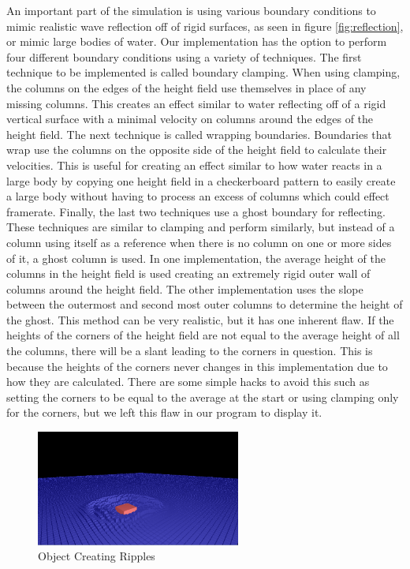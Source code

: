 \documentclass[11pt]{article}
\begin{document}
An important part of the simulation is using various boundary conditions to 
mimic realistic wave reflection off of rigid surfaces, as seen in figure 
\ref{fig:reflection}, or mimic large bodies of 
water. Our implementation has the option to perform four different boundary 
conditions using a variety of techniques. The first technique to be implemented 
is called boundary clamping. When using clamping, the columns on the edges of 
the height field use themselves in place of any missing columns. This creates 
an effect similar to water reflecting off of a rigid vertical surface with a 
minimal velocity on columns around the edges of the height field. The next 
technique is called wrapping boundaries. Boundaries that wrap use the columns 
on the opposite side of the height field to calculate their velocities. This is 
useful for creating an effect similar to how water reacts in a large body by 
copying one height field in a checkerboard pattern to easily create a large 
body without having to process an excess of columns which could effect 
framerate. Finally, the last two techniques use a ghost boundary for 
reflecting. These techniques are similar to clamping and perform similarly, but 
instead of a column using itself as a reference when there is no column on one 
or more sides of it, a ghost column is used. In one implementation, the average 
height of the columns in the height field is used creating an extremely rigid 
outer wall of columns around the height field. The other implementation uses 
the slope between the outermost and second most outer columns to determine the 
height of the ghost. This method can be very realistic, but it has one inherent 
flaw. If the heights of the corners of the height field are not equal to the 
average height of all the columns, there will be a slant leading to the corners 
in question. This is because the heights of the corners never changes in this 
implementation due to how they are calculated. There are some simple hacks to 
avoid this such as setting the corners to be equal to the average at the start 
or using clamping only for the corners, but we left this flaw in our program to 
display it.

\begin{figure}[H]
    \caption{Object Creating Ripples}
    \label{fig:ripples}
    \centering
    \includegraphics[width=0.6\textwidth]{../www/images/objectRipples}
\end{figure}
\end{document}

